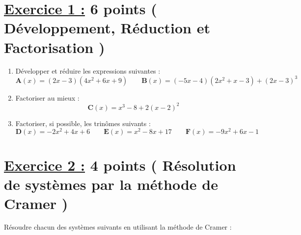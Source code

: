 \documentclass[12pt,a4paper]{article}
\begin{document}
\renewcommand{\arraystretch}{1.5}
\renewcommand{\arrayrulewidth}{1.2pt}
\vspace{3cm}

\section*{\underline{Exercice 1 :} 6 points ( Développement, Réduction et Factorisation )}
\begin{enumerate}
\item Développer et réduire les expressions suivantes :
\[
\textbf{A}(x) = (2x - 3)(4x^2 + 6x + 9) \quad\quad \textbf{B}(x) = (-5x - 4)(2x^2 + x - 3) + (2x - 3)^3
\]
\item Factoriser au mieux :
\[
\textbf{C}(x) = x^3 - 8 + 2(x - 2)^2 
\]
\item Factoriser, si possible, les trinômes suivants :
\[
\textbf{D}(x) = -2x^2 + 4x + 6\quad\quad \textbf{E}(x) = x^2 - 8x + 17 \quad\quad \textbf{F}(x) = -9x^2 + 6x - 1 
\]
\end{enumerate}


\section*{\underline{Exercice 2 :} 4 points ( Résolution de systèmes par la méthode de Cramer )}
Résoudre chacun des systèmes suivants en utilisant la méthode de Cramer :
\end{document}
